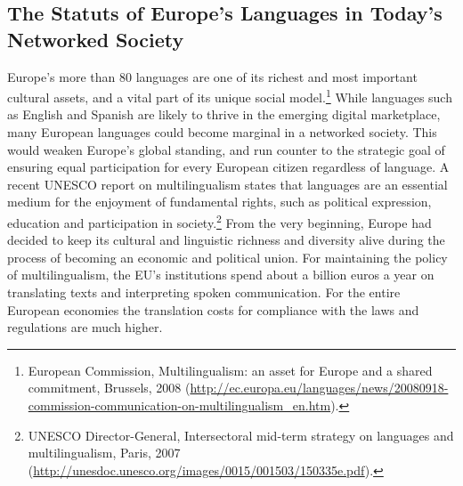 \begin{multicols}{2}

\subsection{The Statuts of Europe's Languages in Today's Networked Society}
\label{sec:status-europes-languages}

Europe’s more than 80 languages are one of its richest and most important cultural assets, and a vital part of its unique social model.\footnote{European Commission, Multilingualism: an asset for Europe and a shared commitment, Brussels, 2008 (\url{http://ec.europa.eu/languages/news/20080918-commission-communication-on-multilingualism_en.htm}).}  While languages such as English and Spanish are likely to thrive in the emerging digital marketplace, many European languages could become marginal in a networked society. This would weaken Europe’s global standing, and run counter to the strategic goal of ensuring equal participation for every European citizen regardless of language. A recent UNESCO report on multilingualism states that languages are an essential medium for the enjoyment of fundamental rights, such as political expression, education and participation in society.\footnote{UNESCO Director-General, Intersectoral mid-term strategy on languages and multilingualism, Paris, 2007 (\url{http://unesdoc.unesco.org/images/0015/001503/150335e.pdf}).} From the very beginning, Europe had decided to keep its cultural and linguistic richness and diversity alive during the process of becoming an economic and political union. For maintaining the policy of multilingualism, the EU’s institutions spend about a billion euros a year on translating texts and interpreting spoken communication. For the entire European economies the translation costs for compliance with the laws and regulations are much higher.
 

\end{multicols}
